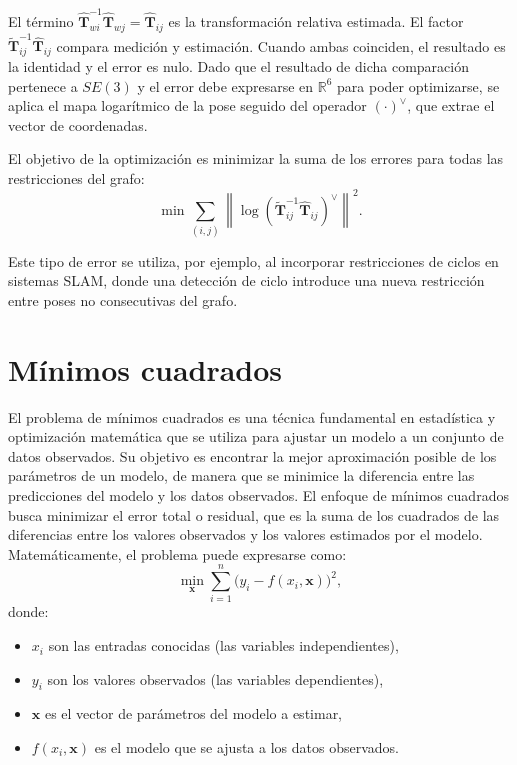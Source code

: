 El término $\hat{\mathbf{T}}_{wi}^{-1}\hat{\mathbf{T}}_{wj} = \hat{\mathbf{T}}_{ij}$ es la transformación relativa estimada. El factor $\tilde{\mathbf{T}}_{ij}^{-1}\hat{\mathbf{T}}_{ij}$ compara medición y estimación. Cuando ambas coinciden, el resultado es la identidad y el error es nulo. Dado que el resultado de dicha comparación pertenece a $SE(3)$ y el error debe expresarse en $\mathbb{R}^6$ para poder optimizarse, se aplica el mapa logarítmico de la pose seguido del operador $(\cdot)^\vee$, que extrae el vector de coordenadas.

El objetivo de la optimización es minimizar la suma de los errores para todas las restricciones del grafo:
\[
\min \sum_{(i,j)} \left\|\log\!\left(\tilde{\mathbf{T}}_{ij}^{-1}\hat{\mathbf{T}}_{ij}\right)^\vee\right\|^2.
\]

Este tipo de error se utiliza, por ejemplo, al incorporar restricciones de ciclos en sistemas SLAM, donde una detección de ciclo introduce una nueva restricción entre poses no consecutivas del grafo.


\section{Mínimos cuadrados}
\label{sec:least_squares}

El problema de mínimos cuadrados es una técnica fundamental en estadística y optimización matemática que se utiliza para ajustar un modelo a un conjunto de datos observados. Su objetivo es encontrar la mejor aproximación posible de los parámetros de un modelo, de manera que se minimice la diferencia entre las predicciones del modelo y los datos observados. El enfoque de mínimos cuadrados busca minimizar el error total o residual, que es la suma de los cuadrados de las diferencias entre los valores observados y los valores estimados por el modelo. Matemáticamente, el problema puede expresarse como:
\[
\min_{\mathbf{x}} \sum_{i=1}^{n} \bigl(y_i - f(x_i, \mathbf{x})\bigr)^2,
\]
donde:
\begin{itemize}
    \item $x_i$ son las entradas conocidas (las variables independientes),
    \item $y_i$ son los valores observados (las variables dependientes),
    \item $\mathbf{x}$ es el vector de parámetros del modelo a estimar,
    \item $f(x_i, \mathbf{x})$ es el modelo que se ajusta a los datos observados.
\end{itemize}

